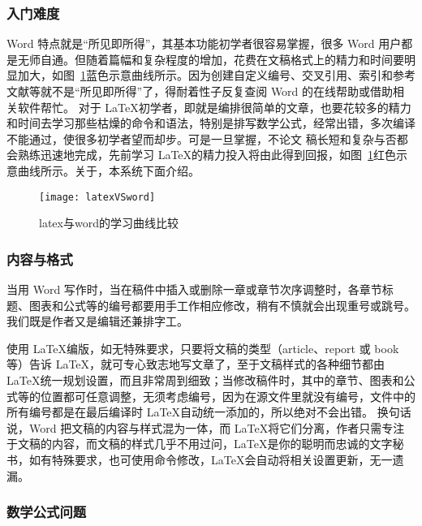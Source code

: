 \subsubsection{入门难度}
\label{sec:rumennandu}

Word 特点就是“所见即所得”，其基本功能初学者很容易掌握，很多 Word 用户都是无师自通。但随着篇幅和复杂程度的增加，花费在文稿格式上的精力和时间要明显加大，如图~\ref{fig:xfig2}蓝色示意曲线所示。因为创建自定义编号、交叉引用、索引和参考文献等就不是“所见即所得”了，得耐着性子反复查阅 Word 的在线帮助或借助相关软件帮忙。
对于 \LaTeX 初学者，即就是编排很简单的文章，也要花较多的精力和时间去学习那些枯燥的命令和语法，特别是排写数学公式，经常出错，多次编译不能通过，使很多初学者望而却步。可是一旦掌握，不论文 稿长短和复杂与否都会熟练迅速地完成，先前学习 \LaTeX 的精力投入将由此得到回报，如图~\ref{fig:xfig2}红色示意曲线所示。关于，本系统下面介绍。
\begin{figure}[H]
  \centering
  \texttt{[image: latexVSword]}
  \caption{latex与word的学习曲线比较}
  \label{fig:xfig2}
\end{figure}

\subsubsection{内容与格式}
\label{sec:neirongyugeshi}

当用 Word 写作时，当在稿件中插入或删除一章或章节次序调整时，各章节标题、图表和公式等的编号都要用手工作相应修改，稍有不慎就会出现重号或跳号。 我们既是作者又是编辑还兼排字工。

使用 \LaTeX 编版，如无特殊要求，只要将文稿的类型（article、report 或 book 等）告诉 \LaTeX，就可专心致志地写文章了，至于文稿样式的各种细节都由 \LaTeX 统一规划设置，而且非常周到细致；当修改稿件时，其中的章节、图表和公式等的位置都可任意调整，无须考虑编号，因为在源文件里就没有编号，文件中的所有编号都是在最后编译时 \LaTeX 自动统一添加的，所以绝对不会出错。
换句话说，Word 把文稿的内容与样式混为一体，而 \LaTeX 将它们分离，作者只需专注于文稿的内容，而文稿的样式几乎不用过问，\LaTeX 是你的聪明而忠诚的文字秘书，如有特殊要求，也可使用命令修改，\LaTeX 会自动将相关设置更新，无一遗漏。

\subsubsection{数学公式问题}
\label{sec:shuxuegongshi}

